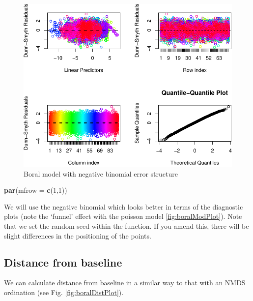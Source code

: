 \documentclass[nofonts,]{tufte-handout}
\newenvironment{Shaded}{\begin{snugshade}}{\end{snugshade}}
\newcommand{\AttributeTok}[1]{\textcolor[rgb]{0.13,0.29,0.53}{#1}}
\newcommand{\DecValTok}[1]{\textcolor[rgb]{0.00,0.00,0.81}{#1}}
\newcommand{\FunctionTok}[1]{\textcolor[rgb]{0.13,0.29,0.53}{\textbf{#1}}}
\newcommand{\NormalTok}[1]{#1}
\begin{document}
\begin{figure}
\includegraphics{Technical-supplement_files/figure-latex/boralModPlot2-1} \caption[Boral model with negative binomial error structure]{Boral model with negative binomial error structure}\label{fig:boralModPlot2}
\end{figure}

\begin{Shaded}
\begin{Highlighting}[]
\FunctionTok{par}\NormalTok{(}\AttributeTok{mfrow =} \FunctionTok{c}\NormalTok{(}\DecValTok{1}\NormalTok{,}\DecValTok{1}\NormalTok{))}
\end{Highlighting}
\end{Shaded}

We will use the negative binomial which looks better in terms of the
diagnostic plots (note the `funnel' effect with the poisson model
\ref{fig:boralModPlot}). Note that we set the random seed within the
function. If you amend this, there will be slight differences in the
positioning of the points.

\hypertarget{distance-from-baseline}{%
\subsection{Distance from baseline}\label{distance-from-baseline}}

We can calculate distance from baseline in a similar way to that with an
NMDS ordination (see Fig. \ref{fig:boralDistPlot}).
\end{document}
